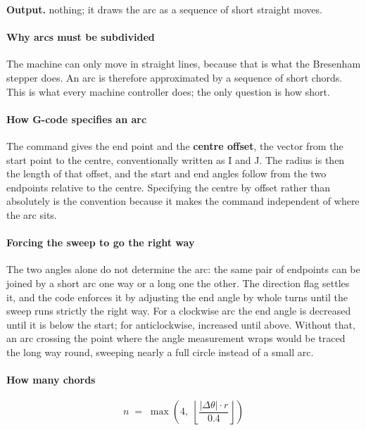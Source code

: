\noindent\textbf{Output.} nothing; it draws the arc as a sequence of short straight moves.


\paragraph{Why arcs must be subdivided}
The machine can only move in straight lines, because that is what the Bresenham stepper does. An arc is therefore approximated by a sequence of short chords. This is what every machine controller does; the only question is how short.


\paragraph{How G-code specifies an arc}
The command gives the end point and the \textbf{centre offset}, the vector from the start point to the centre, conventionally written as I and J. The radius is then the length of that offset, and the start and end angles follow from the two endpoints relative to the centre. Specifying the centre by offset rather than absolutely is the convention because it makes the command independent of where the arc sits.


\paragraph{Forcing the sweep to go the right way}
The two angles alone do not determine the arc: the same pair of endpoints can be joined by a short arc one way or a long one the other. The direction flag settles it, and the code enforces it by adjusting the end angle by whole turns until the sweep runs strictly the right way. For a clockwise arc the end angle is decreased until it is below the start; for anticlockwise, increased until above. Without that, an arc crossing the point where the angle measurement wraps would be traced the long way round, sweeping nearly a full circle instead of a small arc.


\paragraph{How many chords}

\begin{equation}
n \;=\; \max\!\left(4,\; \left\lfloor \frac{|\Delta\theta| \cdot r}{0.4} \right\rfloor \right)
\end{equation}

